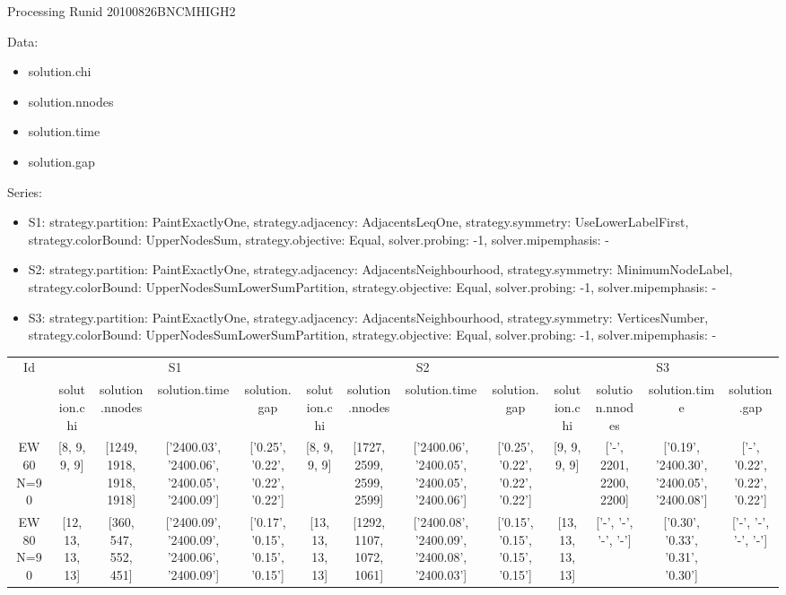 \documentclass[landscape, 12pt]{report}
\begin{document}
Processing Runid 20100826BNCMHIGH2

Data:
\begin{itemize}
\item solution.chi
\item solution.nnodes
\item solution.time
\item solution.gap
\end{itemize}
Series:
\begin{itemize}
\item S1: strategy.partition: PaintExactlyOne, strategy.adjacency: AdjacentsLeqOne, strategy.symmetry: UseLowerLabelFirst, strategy.colorBound: UpperNodesSum, strategy.objective: Equal, solver.probing: -1, solver.mipemphasis: -
\item S2: strategy.partition: PaintExactlyOne, strategy.adjacency: AdjacentsNeighbourhood, strategy.symmetry: MinimumNodeLabel, strategy.colorBound: UpperNodesSumLowerSumPartition, strategy.objective: Equal, solver.probing: -1, solver.mipemphasis: -
\item S3: strategy.partition: PaintExactlyOne, strategy.adjacency: AdjacentsNeighbourhood, strategy.symmetry: VerticesNumber, strategy.colorBound: UpperNodesSumLowerSumPartition, strategy.objective: Equal, solver.probing: -1, solver.mipemphasis: -
\end{itemize}
\begin{tabular}{|c|cccc|cccc|cccc|}
\hline
\multicolumn{1}{|c|}{Id} & \multicolumn{4}{|c|}{S1} & \multicolumn{4}{|c|}{S2} & \multicolumn{4}{|c|}{S3}
\\
 & solution.chi & solution.nnodes & solution.time & solution.gap & solution.chi & solution.nnodes & solution.time & solution.gap & solution.chi & solution.nnodes & solution.time & solution.gap
\\
\hline
EW 60 N=90 & [8, 9, 9, 9] & [1249, 1918, 1918, 1918] & ['2400.03', '2400.06', '2400.05', '2400.09'] & ['0.25', '0.22', '0.22', '0.22'] & [8, 9, 9, 9] & [1727, 2599, 2599, 2599] & ['2400.06', '2400.05', '2400.05', '2400.06'] & ['0.25', '0.22', '0.22', '0.22'] & [9, 9, 9, 9] & ['-', 2201, 2200, 2200] & ['0.19', '2400.30', '2400.05', '2400.08'] & ['-', '0.22', '0.22', '0.22']
\\
EW 80 N=90 & [12, 13, 13, 13] & [360, 547, 552, 451] & ['2400.09', '2400.09', '2400.06', '2400.09'] & ['0.17', '0.15', '0.15', '0.15'] & [13, 13, 13, 13] & [1292, 1107, 1072, 1061] & ['2400.08', '2400.09', '2400.08', '2400.03'] & ['0.15', '0.15', '0.15', '0.15'] & [13, 13, 13, 13] & ['-', '-', '-', '-'] & ['0.30', '0.33', '0.31', '0.30'] & ['-', '-', '-', '-']
\\
\hline 
 \end{tabular}
	
\end{document}
